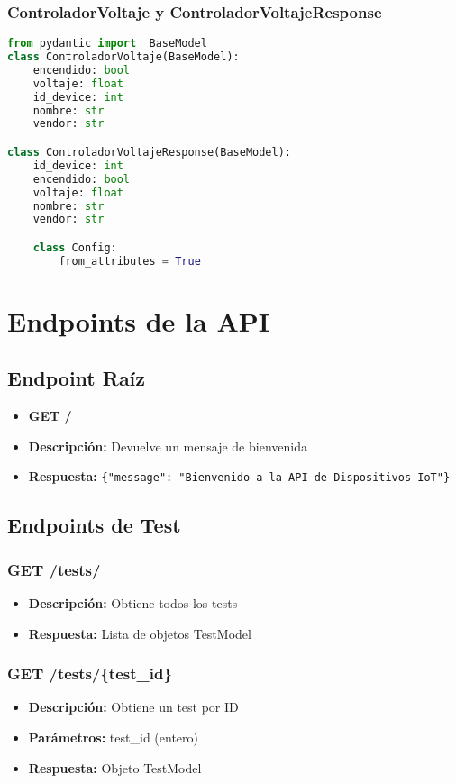 \documentclass[12pt,letterpaper]{report}
\begin{document}
\subsection{ControladorVoltaje y ControladorVoltajeResponse}
\begin{lstlisting}[language=python]
    from pydantic import  BaseModel
class ControladorVoltaje(BaseModel):
    encendido: bool
    voltaje: float
    id_device: int
    nombre: str
    vendor: str

class ControladorVoltajeResponse(BaseModel):
    id_device: int
    encendido: bool
    voltaje: float
    nombre: str
    vendor: str

    class Config:
        from_attributes = True
\end{lstlisting}

\chapter{Endpoints de la API}

\section{Endpoint Raíz}
\begin{itemize}
    \item \textbf{GET /}
    \item \textbf{Descripción:} Devuelve un mensaje de bienvenida
    \item \textbf{Respuesta:} \texttt{\{"message": "Bienvenido a la API de Dispositivos IoT"\}}
\end{itemize}

\section{Endpoints de Test}
\subsection{GET /tests/}
\begin{itemize}
    \item \textbf{Descripción:} Obtiene todos los tests
    \item \textbf{Respuesta:} Lista de objetos TestModel
\end{itemize}

\subsection{GET /tests/\{test\_id\}}
\begin{itemize}
    \item \textbf{Descripción:} Obtiene un test por ID
    \item \textbf{Parámetros:} test\_id (entero)
    \item \textbf{Respuesta:} Objeto TestModel
\end{itemize}
\end{document}
